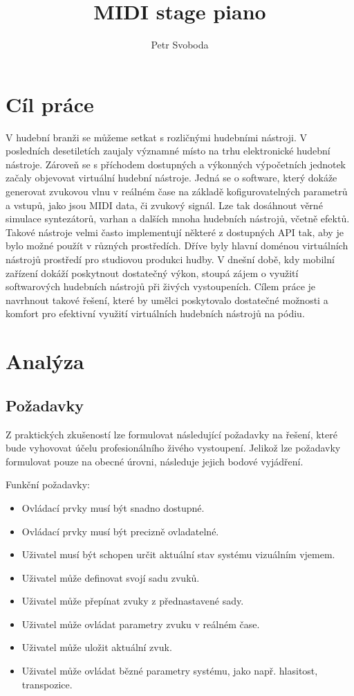 \documentclass[thesis=M,czech]{FITthesis}[2019/03/06]
\title{MIDI stage piano}
\author{Petr Svoboda} %
\begin{document}

\begin{introduction}
\end{introduction}

\chapter{Cíl práce}
V hudební branži se můžeme setkat s rozličnými hudebními nástroji. V posledních desetiletích
zaujaly významné místo na trhu elektronické hudební nástroje. Zároveň se s příchodem dostupných a výkonných
výpočetních jednotek začaly objevovat virtuální hudební nástroje\cite{kogan2008brief}.
Jedná se o software, který dokáže generovat zvukovou vlnu v reálném čase na základě kofigurovatelných parametrů a vstupů, jako jsou MIDI data, či zvukový signál.
Lze tak dosáhnout věrné simulace syntezátorů, varhan a dalších mnoha hudebních nástrojů, včetně efektů.
Takové nástroje velmi často implementují některé z dostupných API tak, aby je bylo možné použít v různých prostředích.
Dříve byly hlavní doménou virtuálních nástrojů prostředí pro studiovou produkci hudby\cite{leider2004digital}.
V dnešní době, kdy mobilní zařízení dokáží poskytnout dostatečný výkon, stoupá zájem o využití softwarových hudebních nástrojů
při živých vystoupeních. Cílem práce je navrhnout takové řešení, které by umělci poskytovalo dostatečné možnosti a komfort 
pro efektivní využití virtuálních hudebních nástrojů na pódiu.

\chapter{Analýza}
	\section{Požadavky}
		Z praktických zkušeností lze formulovat následující požadavky na řešení, které bude vyhovovat účelu profesionálního živého vystoupení.
		Jelikož lze požadavky formulovat pouze na obecné úrovni, následuje jejich bodové vyjádření.
		
		Funkční požadavky:
		\begin{itemize}
			\item Ovládací prvky musí být snadno dostupné.
			\item Ovládací prvky musí být precizně ovladatelné.
			\item Uživatel musí být schopen určit aktuální stav systému vizuálním vjemem.
			\item Uživatel může definovat svojí sadu zvuků.
			\item Uživatel může přepínat zvuky z přednastavené sady.
			\item Uživatel může ovládat parametry zvuku v reálném čase.
			\item Uživatel může uložit aktuální zvuk.
			\item Uživatel může ovládat bězné parametry systému, jako např. hlasitost, transpozice.
		\end{itemize}
	
\end{document}
